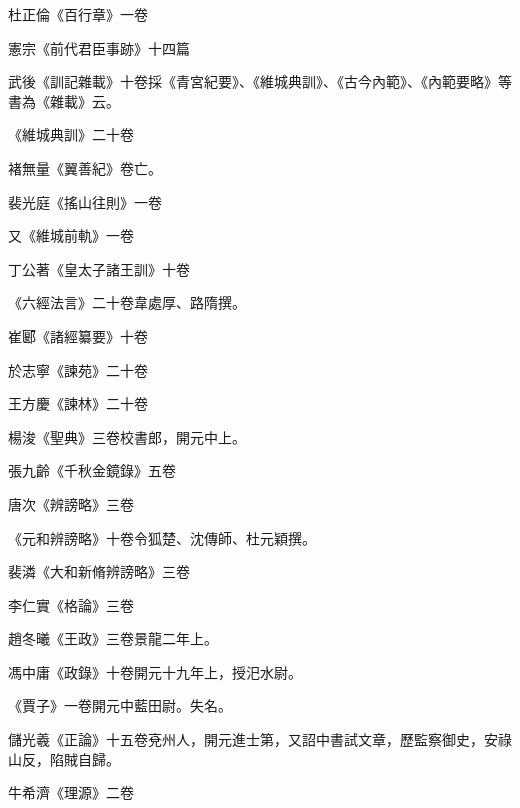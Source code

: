 \begin{pinyinscope}
 杜正倫《百行章》一卷



 憲宗《前代君臣事跡》十四篇



 武後《訓記雜載》十卷採《青宮紀要》、《維城典訓》、《古今內範》、《內範要略》等書為《雜載》云。



 《維城典訓》二十卷



 褚無量《翼善紀》卷亡。



 裴光庭《搖山往則》一卷



 又《維城前軌》一卷



 丁公著《皇太子諸王訓》十卷



 《六經法言》二十卷韋處厚、路隋撰。



 崔郾《諸經纂要》十卷



 於志寧《諫苑》二十卷



 王方慶《諫林》二十卷



 楊浚《聖典》三卷校書郎，開元中上。



 張九齡《千秋金鏡錄》五卷



 唐次《辨謗略》三卷



 《元和辨謗略》十卷令狐楚、沈傳師、杜元穎撰。



 裴潾《大和新脩辨謗略》三卷



 李仁實《格論》三卷



 趙冬曦《王政》三卷景龍二年上。



 馮中庸《政錄》十卷開元十九年上，授汜水尉。



 《賈子》一卷開元中藍田尉。失名。



 儲光羲《正論》十五卷兗州人，開元進士第，又詔中書試文章，歷監察御史，安祿山反，陷賊自歸。



 牛希濟《理源》二卷




\end{pinyinscope}
